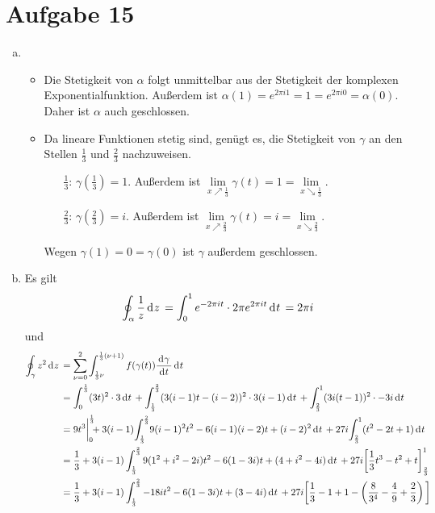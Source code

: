\documentclass{article}
\theoremstyle{definition}
\begin{document}
\section*{Aufgabe 15}
\begin{enumerate}[(a)]
	\item \begin{itemize}
		\item Die Stetigkeit von $\alpha$ folgt unmittelbar aus der Stetigkeit der komplexen Exponentialfunktion. Außerdem ist $\alpha(1) = e^{2\pi i 1} = 1 = e^{2\pi i 0} = \alpha(0)$. Daher ist $\alpha$ auch geschlossen.
		\item Da lineare Funktionen stetig sind, genügt es, die Stetigkeit von $\gamma$ an den Stellen $\frac{1}{3}$ und $\frac{2}{3}$ nachzuweisen.
		\begin{itemize}
			\item[$\frac{1}{3}$:] $\gamma\left(\frac{1}{3}\right) = 1$. Außerdem ist $\lim\limits_{x\nearrow\frac{1}{3}} \gamma(t) = 1 = \lim\limits_{x\searrow \frac{1}{3}}$.
			\item[$\frac{2}{3}$:] $\gamma\left(\frac{2}{3}\right) = i$.  Außerdem ist $\lim\limits_{x\nearrow\frac{2}{3}} \gamma(t) = i = \lim\limits_{x\searrow \frac{2}{3}}$.
		\end{itemize}
		Wegen $\gamma(1) = 0 = \gamma(0)$ ist $\gamma$ außerdem geschlossen.
	\end{itemize}
	\item Es gilt $$\oint_\alpha \frac{1}{z} \d z = \int_0^1 e^{-2\pi i t}\cdot 2\pi e^{2\pi i t} \d t = 2\pi i$$ und
	\begin{align*}
		\oint_\gamma z^2 \d z &= \sum_{\nu = 0}^{2} \int_{\frac{1}{3} \nu}^{\frac{1}{3}(\nu +1)} f(\gamma(t)) \frac{\d \gamma}{\d t}\d t\\
		&= \int_0^\frac{1}{3} (3t)^2 \cdot 3 \d t + \int_\frac{1}{3}^\frac{2}{3} (3 (i-1)t - (i-2))^2 \cdot 3(i-1) \d t + \int_\frac{2}{3}^1 (3 i (t-1))^2 \cdot - 3i \d t\\
		&= 9 t^3\bigg|_0^\frac{1}{3}\!\!\!+ 3(i-1)\! \int_\frac{1}{3}^\frac{2}{3}\! 9 (i-1)^2 t^2 - 6(i-1)(i-2)t + (i-2)^2 \d t + 27i\! \int_\frac{2}{3}^1 (t^2 - 2t + 1) \d t\\
		&= \frac{1}{3} + 3(i-1) \int_\frac{1}{3}^\frac{2}{3} 9 (1^2 + i^2 -2i)t^2 - 6(1-3i)t + (4 +i^2-4i) \d t + 27i  \bigg[\frac{1}{3}t^3 - t^2 + t\bigg]_\frac{2}{3}^1\\
		&= \frac{1}{3} + 3(i-1) \int_\frac{1}{3}^\frac{2}{3} -18it^2 - 6(1-3i)t + (3-4i) \d t + 27i  \bigg[\frac{1}{3} - 1 + 1-\left(\frac{8}{3^4} - \frac{4}{9} + \frac{2}{3}\right)\bigg]\\

\end{align*}
\end{enumerate}
\end{document}
